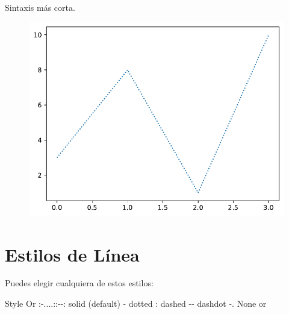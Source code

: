 \begin{code} Sintaxis más corta.

\begin{Shaded}
\begin{Highlighting}[]
\OperatorTok{=} \StringTok{\textquotesingle{}:\textquotesingle{}}\NormalTok{)}
\end{Highlighting}
\end{Shaded}

\begin{figure}
  \centering
  \includegraphics[scale=0.6]{img/grafica1018.pdf}
\end{figure}

\end{code}

\section{Estilos de Línea}

Puedes elegir cualquiera de estos estilos:

\textbar{} Style \textbar{} Or \textbar{}
\textbar:-....:\textbar:-\/-:\textbar{} \textbar{}
\textquotesingle solid\textquotesingle{} \textbar{} (default)
\textquotesingle-\textquotesingle{} \textbar{} \textbar{}
\textquotesingle dotted\textquotesingle{} \textbar{}
\textquotesingle:\textquotesingle{} \textbar{} \textbar{}
\textquotesingle dashed\textquotesingle{} \textbar{}
\textquotesingle-\/-\textquotesingle{} \textbar{} \textbar{}
\textquotesingle dashdot\textquotesingle{} \textbar{}
\textquotesingle-.\textquotesingle{} \textbar{} \textbar{}
\textquotesingle None\textquotesingle{} \textbar{}
\textquotesingle\textquotesingle{} or \textquotesingle{}
\textquotesingle{} \textbar{}

